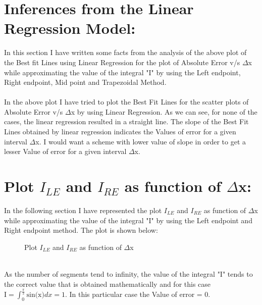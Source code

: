 \documentclass[12pt,a4paper]{article}
\begin{document}
\section{Inferences from the Linear Regression Model:}
In this section I have written some facts from the analysis of the above plot of the Best fit Lines using Linear Regression for the plot of Absolute Error v/s $\Delta$x while approximating the value of the integral "I" by using the Left endpoint, Right endpoint, Mid point and Trapezoidal Method.\\
\\In the above plot I have tried to plot the Best Fit Lines for the scatter plots of Absolute Error v/s $\Delta$x by using Linear Regression. As we can see, for none of the cases, the linear regression resulted in a straight line. The slope of the Best Fit Lines obtained by linear regression indicates the Values of error for a given interval $\Delta$x. I would want a scheme with lower value of slope in order to get a lesser Value of error for a given interval $\Delta$x.
\section{Plot $I_{LE}$ and $I_{RE}$ as function of $\Delta$x:}
In the following section I have represented the plot $I_{LE}$ and $I_{RE}$ as function of $\Delta$x while approximating the value of the integral "I" by using the Left endpoint and Right endpoint method. The plot is shown below:
\begin{figure}[h]
	\begin{center}
	\end{center}
	\caption{Plot $I_{LE}$ and $I_{RE}$ as function of $\Delta$x}
\end{figure}
\\As the number of segments tend to infinity, the value of the integral "I" tends to the correct value that is obtained mathematically and for this case $	\text{I} = \int_{0}^{\frac{\pi}{2}}{ \text{sin(x)}dx} = 1$. In this particular case the Value of error = 0.
\end{document}
